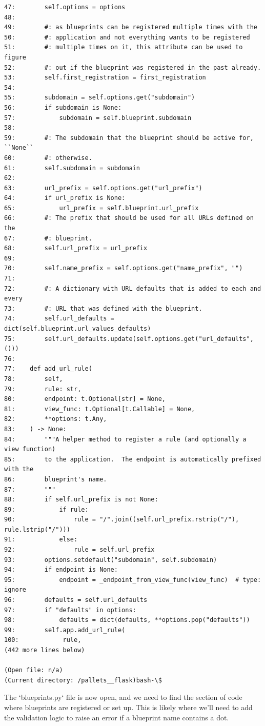 {\begin{observationbox}
\begin{Verbatim}[breaklines=true, breakanywhere=true]
47:        self.options = options
48:
49:        #: as blueprints can be registered multiple times with the
50:        #: application and not everything wants to be registered
51:        #: multiple times on it, this attribute can be used to figure
52:        #: out if the blueprint was registered in the past already.
53:        self.first_registration = first_registration
54:
55:        subdomain = self.options.get("subdomain")
56:        if subdomain is None:
57:            subdomain = self.blueprint.subdomain
58:
59:        #: The subdomain that the blueprint should be active for, ``None``
60:        #: otherwise.
61:        self.subdomain = subdomain
62:
63:        url_prefix = self.options.get("url_prefix")
64:        if url_prefix is None:
65:            url_prefix = self.blueprint.url_prefix
66:        #: The prefix that should be used for all URLs defined on the
67:        #: blueprint.
68:        self.url_prefix = url_prefix
69:
70:        self.name_prefix = self.options.get("name_prefix", "")
71:
72:        #: A dictionary with URL defaults that is added to each and every
73:        #: URL that was defined with the blueprint.
74:        self.url_defaults = dict(self.blueprint.url_values_defaults)
75:        self.url_defaults.update(self.options.get("url_defaults", ()))
76:
77:    def add_url_rule(
78:        self,
79:        rule: str,
80:        endpoint: t.Optional[str] = None,
81:        view_func: t.Optional[t.Callable] = None,
82:        **options: t.Any,
83:    ) -> None:
84:        """A helper method to register a rule (and optionally a view function)
85:        to the application.  The endpoint is automatically prefixed with the
86:        blueprint's name.
87:        """
88:        if self.url_prefix is not None:
89:            if rule:
90:                rule = "/".join((self.url_prefix.rstrip("/"), rule.lstrip("/")))
91:            else:
92:                rule = self.url_prefix
93:        options.setdefault("subdomain", self.subdomain)
94:        if endpoint is None:
95:            endpoint = _endpoint_from_view_func(view_func)  # type: ignore
96:        defaults = self.url_defaults
97:        if "defaults" in options:
98:            defaults = dict(defaults, **options.pop("defaults"))
99:        self.app.add_url_rule(
100:            rule,
(442 more lines below)

(Open file: n/a)
(Current directory: /pallets__flask)bash-\$
\end{Verbatim}
\end{observationbox}
\begin{agentbox}
The `blueprints.py` file is now open, and we need to find the section of code where blueprints are registered or set up. This is likely where we'll need to add the validation logic to raise an error if a blueprint name contains a dot.




\end{agentbox}}
